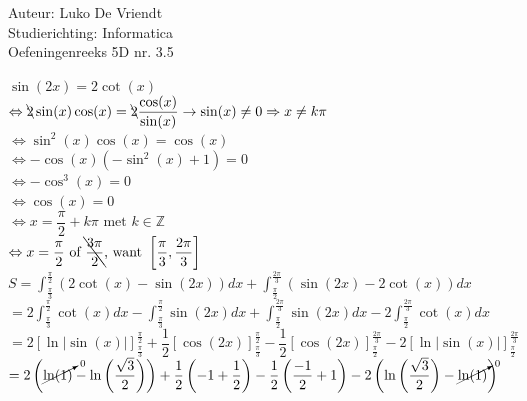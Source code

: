 \documentclass[a4paper]{article}
\begin{document}
\noindent \large Auteur: Luko De Vriendt\\
\noindent \large Studierichting: Informatica\\
\noindent \large Oefeningenreeks 5D nr. 3.5\\

\medskip

\normalsize

$\sin (2x) = 2\cot(x)$ \\

$\Leftrightarrow \bcancel{2}\sin(x)\cos(x) = \bcancel{2} \dfrac{\cos(x)}{\sin(x)} \rightarrow \sin(x) \not = 0 \Rightarrow x \not = k\pi$ \\

$\Leftrightarrow \sin^2(x)\cos(x) = \cos(x)$ \\

$\Leftrightarrow -\cos(x)\left(-\sin^2(x)+1\right) = 0$ \\

$\Leftrightarrow -\cos^3(x) = 0$ \\

$\Leftrightarrow \cos(x) = 0$ \\

$\Leftrightarrow x = \dfrac{\pi}{2} + k\pi \text{ met } k \in \mathbb{Z}$ \\

$\Leftrightarrow x = \dfrac{\pi}{2} \text{ of } \bcancel{\dfrac{3\pi}{2}} \text{, want } \left[\dfrac{\pi}{3}, \dfrac{2\pi}{3}\right]$ \\

$S = \displaystyle \int_{\tfrac{\pi}{3}}^{\tfrac{\pi}{2}} \left ( 2\cot(x) - \sin(2x)\right)dx + \displaystyle \int_{\tfrac{\pi}{2}}^{\tfrac{2\pi}{3}} \left ( \sin(2x) - 2\cot(x)\right)dx$ \\

$= 2\displaystyle \int_{\tfrac{\pi}{3}}^{\tfrac{\pi}{2}} \cot(x)dx - \displaystyle \int_{\tfrac{\pi}{3}}^{\tfrac{\pi}{2}} \sin(2x)dx + \displaystyle \int_{\tfrac{\pi}{2}}^{\tfrac{2\pi}{3}} \sin(2x)dx - 2\displaystyle \int_{\tfrac{\pi}{2}}^{\tfrac{2\pi}{3}} \cot(x)dx$ \\

$= 2\left[\ln|\sin(x)|\right]_{\tfrac{\pi}{3}}^{\tfrac{\pi}{2}} + \dfrac{1}{2}\left[\cos(2x)\right]_{\tfrac{\pi}{3}}^{\tfrac{\pi}{2}} - \dfrac{1}{2}\left[\cos(2x)\right]_{\tfrac{\pi}{2}}^{\tfrac{2\pi}{3}} - 2\left[\ln|\sin(x)|\right]_{\tfrac{\pi}{2}}^{\tfrac{2\pi}{3}}$ \\

$= 2\left(\cancelto{0}{\ln(1)} - \ln\left(\dfrac{\sqrt{3}}{2}\right)\right) + \dfrac{1}{2}\left(-1 + \dfrac{1}{2}\right) - \dfrac{1}{2}\left(\dfrac{-1}{2} + 1\right) -2\left(\ln\left(\dfrac{\sqrt{3}}{2}\right)- \cancelto{0}{\ln(1)}\right)$ \\
\end{document}
